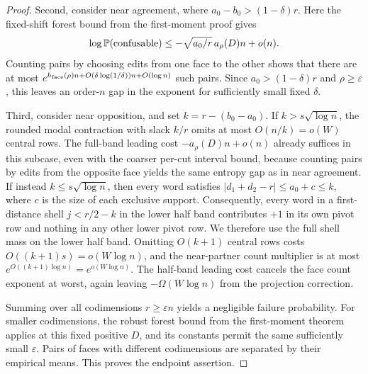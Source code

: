 \begin{proof}
Second, consider near agreement, where \(a_0-b_0>(1-\delta)r\). Here the fixed-shift forest bound from the first-moment proof gives
\[
 \log\mathbb P(\text{confusable})\le -\sqrt{a_0/r}\,a_\rho(D)n+o(n).
\]
Counting pairs by choosing edits from one face to the other shows that there are at most \(e^{h_{\rm face}(\rho)n+O(\delta\log(1/\delta))n+O(\log n)}\) such pairs. Since \(a_0>(1-\delta)r\) and \(\rho\ge\varepsilon\), this leaves an order-\(n\) gap in the exponent for sufficiently small fixed \(\delta\).

Third, consider near opposition, and set \(k=r-(b_0-a_0)\). If \(k>s\sqrt{\log n}\), the rounded modal contraction with slack \(k/r\) omits at most \(O(n/k)=o(W)\) central rows. The full-band leading cost \(-a_\rho(D)n+o(n)\) already suffices in this subcase, even with the coarser per-cut interval bound, because counting pairs by edits from the opposite face yields the same entropy gap as in near agreement. If instead \(k\le s\sqrt{\log n}\), then every word satisfies \(|d_1+d_2-r|\le a_0+c\le k\), where \(c\) is the size of each exclusive support. Consequently, every word in a first-distance shell \(j<r/2-k\) in the lower half band contributes \(+1\) in its own pivot row and nothing in any other lower pivot row. We therefore use the full shell mass on the lower half band. Omitting \(O(k+1)\) central rows costs \(O((k+1)s)=o(W\log n)\), and the near-partner count multiplier is at most \(e^{O((k+1)\log n)}=e^{o(W\log n)}\). The half-band leading cost cancels the face count exponent at worst, again leaving \(-\Omega(W\log n)\) from the projection correction.

Summing over all codimensions \(r\ge\varepsilon n\) yields a negligible failure probability. For smaller codimensions, the robust forest bound from the first-moment theorem applies at this fixed positive \(D\), and its constants permit the same sufficiently small \(\varepsilon\). Pairs of faces with different codimensions are separated by their empirical means. This proves the endpoint assertion.
\end{proof}
